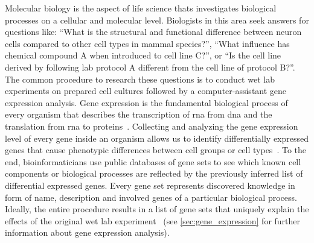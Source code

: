 \documentclass{thesisclass}
\begin{document}
Molecular biology is the aspect of life science thats investigates biological processes on a cellular and molecular level. Biologists in this area seek answers for questions like: ``What is the structural and functional difference between neuron cells compared to other cell types in mammal species?'', ``What influence has chemical compound A when introduced to cell line C?'', or ``Is the cell line derived by following lab protocol A different from the cell line of protocol B?''.
The common procedure to research these questions is to conduct wet lab experiments on prepared cell cultures followed by a computer-assistant gene expression analysis. 
Gene expression is the fundamental biological process of every organism that describes the transcription of \acrfull{rna} from \acrfull{dna} and the translation from \acrshort{rna} to proteins~\cite{citeulike:691434}. 
Collecting and analyzing the gene expression level of every gene inside an organism allows us to identify differentially expressed genes that cause phenotypic differences between cell groups or cell types~\cite{doi:10.1093/bioinformatics/btp616}. To the end, bioinformaticians use public databases of gene sets to see which known cell components or biological processes are reflected by the previously inferred list of differential expressed genes. 
Every gene set represents discovered knowledge in form of name, description and involved genes of a particular biological process. 
Ideally, the entire procedure results in a list of gene sets that uniquely explain the effects of the original wet lab experiment~\cite{doi:10.1093/nar/gks461} (see \cref{sec:gene_expression} for further information about gene expression analysis).
\end{document}
